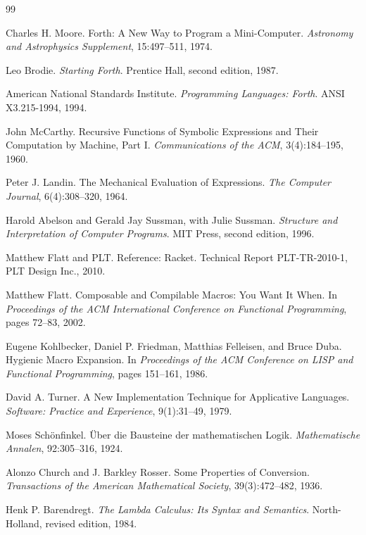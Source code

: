 \documentclass[11pt,oneside]{report}
\theoremstyle{plain}
\theoremstyle{definition}
\theoremstyle{remark}
\begin{document}
\begin{thebibliography}{99}

 Charles H. Moore. Forth: A New Way to Program a Mini-Computer. \emph{Astronomy and Astrophysics Supplement}, 15:497--511, 1974.

 Leo Brodie. \emph{Starting Forth}. Prentice Hall, second edition, 1987.

 American National Standards Institute. \emph{Programming Languages: Forth}. ANSI X3.215-1994, 1994.

 John McCarthy. Recursive Functions of Symbolic Expressions and Their Computation by Machine, Part I. \emph{Communications of the ACM}, 3(4):184--195, 1960.

 Peter J. Landin. The Mechanical Evaluation of Expressions. \emph{The Computer Journal}, 6(4):308--320, 1964.

 Harold Abelson and Gerald Jay Sussman, with Julie Sussman. \emph{Structure and Interpretation of Computer Programs}. MIT Press, second edition, 1996.

 Matthew Flatt and PLT. Reference: Racket. Technical Report PLT-TR-2010-1, PLT Design Inc., 2010.

 Matthew Flatt. Composable and Compilable Macros: You Want It When. In \emph{Proceedings of the ACM International Conference on Functional Programming}, pages 72--83, 2002.

 Eugene Kohlbecker, Daniel P. Friedman, Matthias Felleisen, and Bruce Duba. Hygienic Macro Expansion. In \emph{Proceedings of the ACM Conference on LISP and Functional Programming}, pages 151--161, 1986.

 David A. Turner. A New Implementation Technique for Applicative Languages. \emph{Software: Practice and Experience}, 9(1):31--49, 1979.

 Moses Sch{\"o}nfinkel. {\"U}ber die Bausteine der mathematischen Logik. \emph{Mathematische Annalen}, 92:305--316, 1924.

 Alonzo Church and J. Barkley Rosser. Some Properties of Conversion. \emph{Transactions of the American Mathematical Society}, 39(3):472--482, 1936.

 Henk P. Barendregt. \emph{The Lambda Calculus: Its Syntax and Semantics}. North-Holland, revised edition, 1984.


\end{thebibliography}
\end{document}
